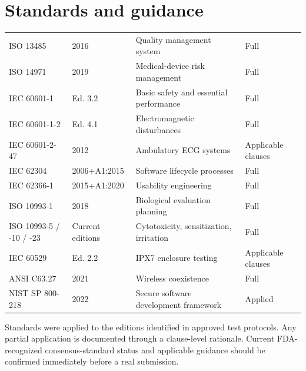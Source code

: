 \section{Standards and guidance}

\begin{tabularx}{\textwidth}{@{}L{2.05in}L{1.25in}Y C{0.78in}@{}}
\toprule
{} &  &  &  \\
\midrule
ISO 13485 & 2016 & Quality management system & Full \\
ISO 14971 & 2019 & Medical-device risk management & Full \\
IEC 60601-1 & Ed. 3.2 & Basic safety and essential performance & Full \\
IEC 60601-1-2 & Ed. 4.1 & Electromagnetic disturbances & Full \\
IEC 60601-2-47 & 2012 & Ambulatory ECG systems & Applicable clauses \\
IEC 62304 & 2006+A1:2015 & Software lifecycle processes & Full \\
IEC 62366-1 & 2015+A1:2020 & Usability engineering & Full \\
ISO 10993-1 & 2018 & Biological evaluation planning & Full \\
ISO 10993-5 / -10 / -23 & Current editions & Cytotoxicity, sensitization, irritation & Full \\
IEC 60529 & Ed. 2.2 & IPX7 enclosure testing & Applicable clauses \\
ANSI C63.27 & 2021 & Wireless coexistence & Full \\
NIST SP 800-218 & 2022 & Secure software development framework & Applied \\
\bottomrule
\end{tabularx}

Standards were applied to the editions identified in approved test protocols. Any partial application is documented through a clause-level rationale. Current FDA-recognized consensus-standard status and applicable guidance should be confirmed immediately before a real submission.

